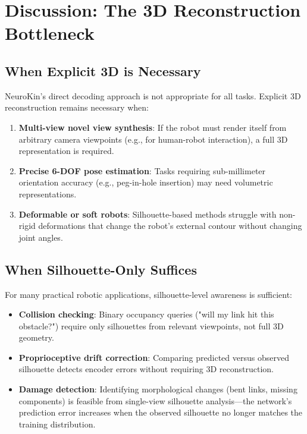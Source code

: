 ﻿\documentclass[12pt,a4paper,oneside]{report}
\begin{document}
\section{Discussion: The 3D Reconstruction Bottleneck}

\subsection{When Explicit 3D is Necessary}

NeuroKin's direct decoding approach is not appropriate for all tasks. Explicit 3D reconstruction remains necessary when:

\begin{enumerate}
    \item \textbf{Multi-view novel view synthesis}: If the robot must render itself from arbitrary camera viewpoints (e.g., for human-robot interaction), a full 3D representation is required.
    \item \textbf{Precise 6-DOF pose estimation}: Tasks requiring sub-millimeter orientation accuracy (e.g., peg-in-hole insertion) may need volumetric representations.
    \item \textbf{Deformable or soft robots}: Silhouette-based methods struggle with non-rigid deformations that change the robot's external contour without changing joint angles.
\end{enumerate}

\subsection{When Silhouette-Only Suffices}

For many practical robotic applications, silhouette-level awareness is sufficient:

\begin{itemize}
    \item \textbf{Collision checking}: Binary occupancy queries ("will my link hit this obstacle?") require only silhouettes from relevant viewpoints, not full 3D geometry.
    \item \textbf{Proprioceptive drift correction}: Comparing predicted versus observed silhouette detects encoder errors without requiring 3D reconstruction.
    \item \textbf{Damage detection}: Identifying morphological changes (bent links, missing components) is feasible from single-view silhouette analysis---the network's prediction error increases when the observed silhouette no longer matches the training distribution.
\end{itemize}
\end{document}
